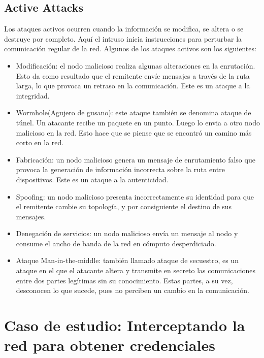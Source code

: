 \subsection{Active Attacks}
Los ataques activos ocurren cuando la información se modifica, se altera o 
se destruye por completo. Aquí el intruso inicia instrucciones para 
perturbar la comunicación regular de la red. Algunos de los ataques 
activos son los  siguientes:
\begin{itemize}
    \setlength\itemsep{-0.6em}
    \item Modificación: el nodo malicioso realiza algunas alteraciones en la 
    enrutación. Esto da como resultado que el remitente envíe mensajes a 
    través de la ruta larga, lo que provoca un retraso en la comunicación. 
    Este es un ataque a la integridad.
    \item Wormhole(Agujero de gusano): este ataque también se denomina ataque 
    de túnel. Un atacante recibe un paquete en un punto. Luego lo envia 
    a otro nodo malicioso en la red. Esto hace que se piense que se encontró 
    un camino más corto en la red.
    \item Fabricación: un nodo malicioso genera un mensaje de enrutamiento 
    falso que provoca la generación de información incorrecta sobre la ruta 
    entre dispositivos. Este es un ataque a la autenticidad.
    \item Spoofing: un nodo malicioso presenta incorrectamente su identidad 
    para que el remitente cambie su topología, y por consiguiente el 
    destino de sus mensajes.
    \item Denegación de servicios: un nodo malicioso envía un mensaje al 
    nodo y consume el ancho de banda de la red en cómputo desperdiciado.
    \item Ataque Man-in-the-middle: también llamado ataque de secuestro, 
    es un ataque en el que el atacante altera y transmite en secreto 
    las comunicaciones entre dos partes legítimas sin su conocimiento. 
    Estas partes, a su vez, desconocen lo que sucede, pues no perciben 
    un cambio en la comunicación.
\end{itemize}


\section{Caso de estudio: Interceptando la red para obtener credenciales}
\label{secCaseOfStudy}


